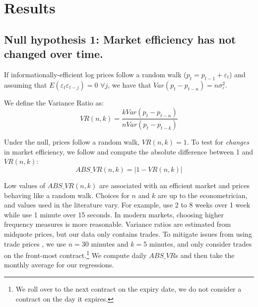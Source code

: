 \documentclass[hidelinks, 11pt]{article}
\begin{document}
\section{Results}
\subsection{Null hypothesis 1: Market efficiency has not changed over time.}


If informationally-efficient log prices follow a random walk ($p_t=p_{t-1}+\varepsilon_{t} $) and assuming that $E\left(  \varepsilon_{t}\varepsilon_{t-j}\right)  =0$ $\forall j$, we have that $Var\left(  p_{t}-p_{t-n}\right) = n\sigma_{\varepsilon}^2$.

\noindent We define the Variance Ratio \citep{lo1988stock} as:
\begin{equation}
VR\left(n, k\right)  =\frac{kVar\left(  p_{t}-p_{t-n}\right)
}{nVar\left(  p_{t}-p_{t-k}\right)  }
\end{equation}

\noindent Under the null, prices follow a random walk, $VR\left(n, k\right)=1$. To test for \emph{changes} in market efficiency, we follow \cite{o2011market} and compute the absolute difference between 1 and $VR\left(n, k\right)$:
\begin{equation}
ABS\_VR\left(n, k\right)  = \left|1 - VR\left(n, k\right)\right|
\end{equation}

\noindent Low values of $ABS\_VR\left(n, k\right)$ are associated with an efficient market and prices behaving like a random walk.
Choices for $n$ and $k$ are up to the econometrician, and values used in the literature vary. For example, \cite{lo1988stock} use 2 to 8 weeks over 1 week while \cite{comerton2019inverted} use 1 minute over 15 seconds. In modern markets, choosing higher frequency measures is more reasonable. Variance ratios are estimated from midquote prices, but our data only contains trades. To mitigate issues from using trade prices \citep[see, e.g.][]{gregoire2020earnings}, we use  $n=$30 minutes and $k=$5 minutes, and only consider trades on the front-most contract.\footnote{We roll over to the next contract on the expiry date, we do not consider a contract on the day it expires.} We compute daily $ABS\_VR$s and then take the monthly average for our regressions. 
\end{document}
